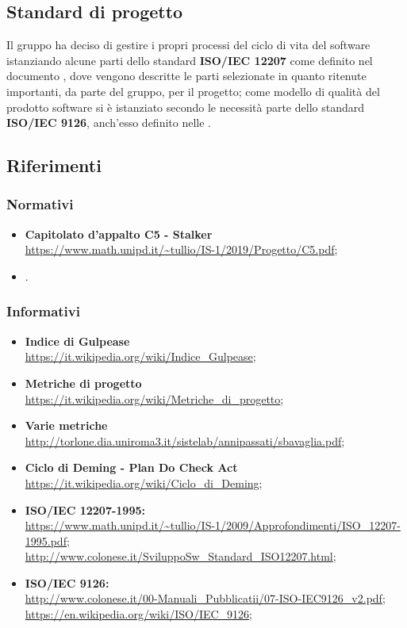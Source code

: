 \subsection{Standard di progetto}
Il gruppo \Gruppo{} ha deciso di gestire i propri processi del ciclo di vita del software istanziando alcune parti dello standard \textbf{ISO/IEC 12207} come definito nel documento \NdP{}, dove vengono descritte le parti selezionate in quanto ritenute importanti, da parte del gruppo, per il progetto; 
come modello di qualità del prodotto software si è istanziato secondo le necessità parte dello standard \textbf{ISO/IEC 9126}, anch'esso definito nelle \NdP{}.

\subsection{Riferimenti}

\subsubsection{Normativi}
\begin{itemize}
    \item \textbf{Capitolato d'appalto C5 - Stalker}\\     
    \url{https://www.math.unipd.it/~tullio/IS-1/2019/Progetto/C5.pdf};
    \item {}.
\end{itemize}

\subsubsection{Informativi}
\begin{itemize}
    \item \textbf{Indice di Gulpease}\\
    \url{https://it.wikipedia.org/wiki/Indice_Gulpease};
    \item \textbf{Metriche di progetto}\\
    \url{https://it.wikipedia.org/wiki/Metriche_di_progetto};
    \item \textbf{Varie metriche}\\
    \url{http://torlone.dia.uniroma3.it/sistelab/annipassati/sbavaglia.pdf};
    \item \textbf{Ciclo di Deming - Plan Do Check Act}\\
    \url{https://it.wikipedia.org/wiki/Ciclo_di_Deming};
    \item \textbf{ISO/IEC 12207-1995:}\\     
    \url{https://www.math.unipd.it/~tullio/IS-1/2009/Approfondimenti/ISO_12207-1995.pdf};\\
    \url{http://www.colonese.it/SviluppoSw_Standard_ISO12207.html};
    \item \textbf{ISO/IEC 9126:}\\
    \url{http://www.colonese.it/00-Manuali_Pubblicatii/07-ISO-IEC9126_v2.pdf};\\
    \url{https://en.wikipedia.org/wiki/ISO/IEC_9126};
\end{itemize}